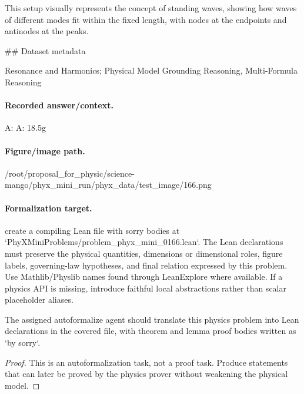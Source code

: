 This setup visually represents the concept of standing waves, showing how waves of different modes fit within the fixed length, with nodes at the endpoints and antinodes at the peaks.

\#\# Dataset metadata

Resonance and Harmonics; Physical Model Grounding Reasoning, Multi-Formula Reasoning

\paragraph{Recorded answer/context.}
A: A: 18.5g

\paragraph{Figure/image path.}
/root/proposal\_for\_physic/science-mango/phyx\_mini\_run/phyx\_data/test\_image/166.png

\paragraph{Formalization target.}
create a compiling Lean file with sorry bodies at `PhyXMiniProblems/problem\_phyx\_mini\_0166.lean`. The Lean declarations must preserve the physical quantities, dimensions or dimensional roles, figure labels, governing-law hypotheses, and final relation expressed by this problem.
Use Mathlib/Physlib names found through LeanExplore where available. If a physics API is missing, introduce faithful local abstractions rather than scalar placeholder aliases.

\begin{theorem}
\label{thm:physics:phyx_mini_0166:target}
The assigned autoformalize agent should translate this physics problem into Lean declarations in the covered file, with theorem and lemma proof bodies written as `by sorry`.
\end{theorem}
\begin{proof}
This is an autoformalization task, not a proof task. Produce statements that can later be proved by the physics prover without weakening the physical model.
\end{proof}

